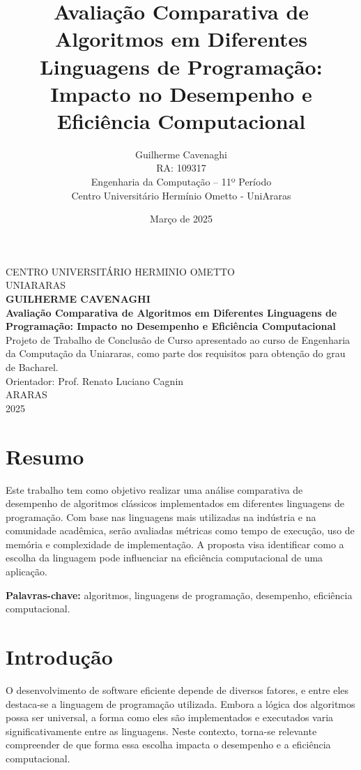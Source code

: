 \documentclass[12pt,oneside,a4paper]{report}
\title{\textbf{Avaliação Comparativa de Algoritmos em Diferentes Linguagens de Programação: Impacto no Desempenho e Eficiência Computacional}}
\author{Guilherme Cavenaghi \\ RA: 109317 \\ Engenharia da Computação -- 11º Período \\ Centro Universitário Hermínio Ometto - UniAraras}
\date{Março de 2025}
\begin{document}
\begin{titlepage}
    \begin{center}
        \large
        CENTRO UNIVERSITÁRIO HERMINIO OMETTO\\
        UNIARARAS\\[1.5cm]

        \textbf{GUILHERME CAVENAGHI}\\[5cm]

        \textbf{\Large Avaliação Comparativa de Algoritmos em Diferentes Linguagens de Programação: Impacto no Desempenho e Eficiência Computacional}\\[1.5cm]

        Projeto de Trabalho de Conclusão de Curso apresentado ao curso de Engenharia da Computação da Uniararas, como parte dos requisitos para obtenção do grau de Bacharel.\\[0.5cm]

        Orientador: Prof. Renato Luciano Cagnin\\[3cm]

        ARARAS\\
        2025
    \end{center}
\end{titlepage}

\chapter*{Resumo}
Este trabalho tem como objetivo realizar uma análise comparativa de desempenho de algoritmos clássicos implementados em diferentes linguagens de programação. Com base nas linguagens mais utilizadas na indústria e na comunidade acadêmica, serão avaliadas métricas como tempo de execução, uso de memória e complexidade de implementação. A proposta visa identificar como a escolha da linguagem pode influenciar na eficiência computacional de uma aplicação.

\textbf{Palavras-chave:} algoritmos, linguagens de programação, desempenho, eficiência computacional.


\chapter{Introdução}
O desenvolvimento de software eficiente depende de diversos fatores, e entre eles destaca-se a linguagem de programação utilizada. Embora a lógica dos algoritmos possa ser universal, a forma como eles são implementados e executados varia significativamente entre as linguagens. Neste contexto, torna-se relevante compreender de que forma essa escolha impacta o desempenho e a eficiência computacional.
\end{document}
